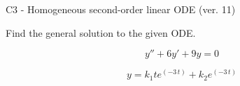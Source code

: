 \begin{exercise}
  \begin{exerciseTitle}C3 - Homogeneous second-order linear ODE (ver. 11)\end{exerciseTitle}
  \begin{exerciseStatement}
    
Find the general solution to the given ODE.

    
\[y''+6y'+9y = 0\]

  \end{exerciseStatement}
  \begin{exerciseAnswer}
    
\[y= k_{1} t e^{\left(-3 \, t\right)} + k_{2} e^{\left(-3 \, t\right)}\]

  \end{exerciseAnswer}
\end{exercise}
